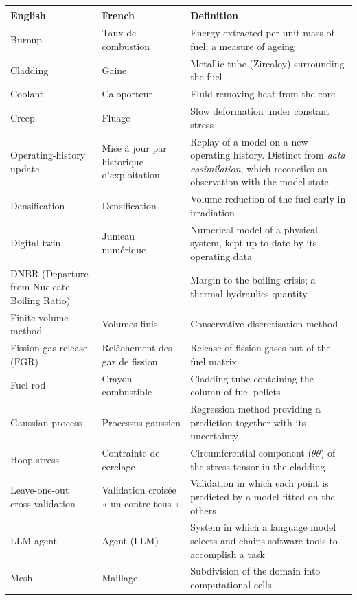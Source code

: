 \noindent
\begin{xltabular}{\textwidth}{@{}>{\raggedright\arraybackslash}p{4.2cm}
                     >{\raggedright\arraybackslash}p{3.1cm}
                     >{\raggedright\arraybackslash}X@{}}
\toprule
\textbf{English} & \textbf{French} & \textbf{Definition}\\
\midrule
\endhead
Burnup & Taux de combustion & Energy extracted per unit mass of fuel; a measure
  of ageing\\
Cladding & Gaine & Metallic tube (Zircaloy) surrounding the fuel\\
Coolant & Caloporteur & Fluid removing heat from the core\\
Creep & Fluage & Slow deformation under constant stress\\
Operating-history update & Mise à jour par historique d'exploitation &
  Replay of a model on a new operating history. Distinct from \emph{data
  assimilation}, which reconciles an observation with the model state\\
Densification & Densification & Volume reduction of the fuel early in
  irradiation\\
Digital twin & Jumeau numérique & Numerical model of a physical system, kept up
  to date by its operating data\\
DNBR (Departure from Nucleate Boiling Ratio) & --- & Margin to the boiling
  crisis; a thermal-hydraulics quantity\\
Finite volume method & Volumes finis & Conservative discretisation method\\
Fission gas release (FGR) & Relâchement des gaz de fission & Release of fission
  gases out of the fuel matrix\\
Fuel rod & Crayon combustible & Cladding tube containing the column of fuel
  pellets\\
Gaussian process & Processus gaussien & Regression method providing a prediction
  together with its uncertainty\\
Hoop stress & Contrainte de cerclage & Circumferential component
  ($\theta\theta$) of the stress tensor in the cladding\\
Leave-one-out cross-validation & Validation croisée « un contre tous » &
  Validation in which each point is predicted by a model fitted on the others\\
LLM agent & Agent (LLM) & System in which a language model selects and chains
  software tools to accomplish a task\\
Mesh & Maillage & Subdivision of the domain into computational cells\\

\end{xltabular}
